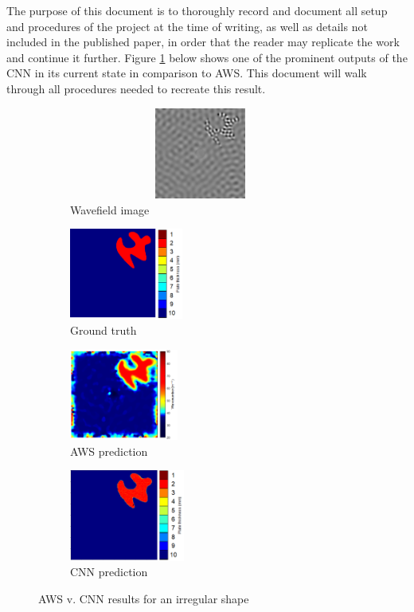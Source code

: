 \documentclass[11pt,letterpaper]{article}
\begin{document}
	The purpose of this document is to thoroughly record and document all setup and procedures of the project at the time of writing, as well as details not included in the published paper, in order that the reader may replicate the work and continue it further. Figure \ref{fig:aws comparison} below shows one of the prominent outputs of the CNN in its current state in comparison to AWS. This document will walk through all procedures needed to recreate this result.
	\begin{figure}[H]
	\centering
		\begin{subfigure}[h]{0.2\textwidth}
			\includegraphics[height=3cm,width=0.95\textwidth]{test_irregular_2_real.png}
			\caption{Wavefield image}
		\end{subfigure}\quad
		\begin{subfigure}[h]{0.25\textwidth}
			\includegraphics[height=3cm,width=\textwidth]{test_irregular_2_truth.png}
			\caption{Ground truth}
		\end{subfigure}
		\begin{subfigure}[h]{0.25\textwidth}
			\includegraphics[height=3cm,width=\textwidth]{test_irregular_2_aws.png}
			\caption{AWS prediction}
		\end{subfigure}
		\begin{subfigure}[h]{0.25\textwidth}
			\includegraphics[height=3cm,width=\textwidth]{test_irregular_2_cnn.png}
			\caption{CNN prediction}
		\end{subfigure}
		\caption{AWS v. CNN results for an irregular shape}
		\label{fig:aws comparison}
	\end{figure}
	\tableofcontents
	\newpage
\end{document}
